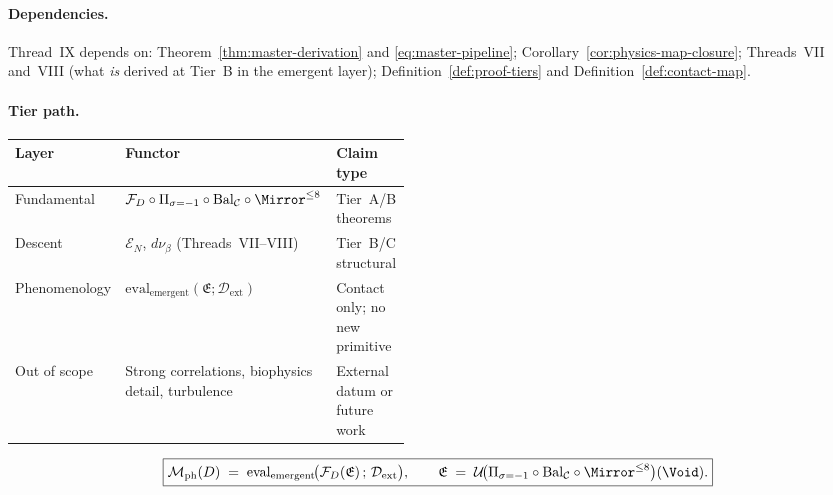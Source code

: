 \paragraph{Dependencies.}
Thread~IX depends on:
Theorem~\ref{thm:master-derivation} and \eqref{eq:master-pipeline};
Corollary~\ref{cor:physics-map-closure};
Threads~VII and~VIII (what \emph{is} derived at Tier~B in the emergent layer);
Definition~\ref{def:proof-tiers} and Definition~\ref{def:contact-map}.

\paragraph{Tier path.}
\begin{center}
\small
\renewcommand{\arraystretch}{1.1}
\begin{tabular}{@{}llp{0.46\linewidth}@{}}
\toprule
\textbf{Layer} & \textbf{Functor} & \textbf{Claim type} \\
\midrule
Fundamental &
  $\mathcal{F}_D\circ\Pi_{\sigma=-1}\circ\mathrm{Bal}_{\mathcal{C}}\circ\Mirror^{\leq 8}$ &
  Tier~A/B theorems \\
Descent &
  $\mathcal{E}_N$, $d\nu_\beta$ (Threads~VII--VIII) &
  Tier~B/C structural \\
Phenomenology &
  $\mathrm{eval}_{\mathrm{emergent}}(\mathfrak{E};\mathcal{D}_{\mathrm{ext}})$ &
  Contact only; no new primitive \\
Out of scope &
  Strong correlations, biophysics detail, turbulence &
  External datum or future work \\
\bottomrule
\end{tabular}
\end{center}

\begin{equation}\label{eq:thread-9-box}
  \boxed{%
  \mathcal{M}_{\mathrm{ph}}(D)
  \;=\;
  \mathrm{eval}_{\mathrm{emergent}}\!\bigl(
    \mathcal{F}_D(\mathfrak{E})\,;\,
    \mathcal{D}_{\mathrm{ext}}
  \bigr),
  \qquad
  \mathfrak{E}
  \;=\;
  \mathcal{U}\!\bigl(
    \Pi_{\sigma=-1}\circ\mathrm{Bal}_{\mathcal{C}}\circ\Mirror^{\leq 8}
  \bigr)(\Void).}
\end{equation}

